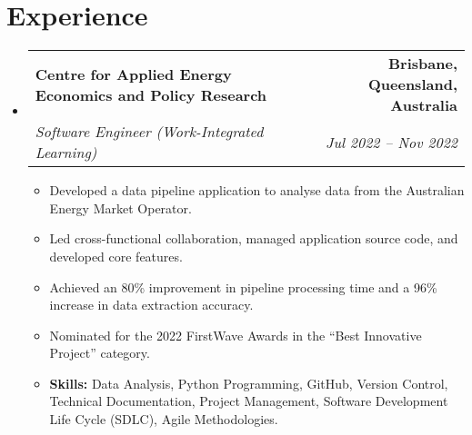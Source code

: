 \documentclass[letterpaper,11pt]{article}
\makeatletter
\newcommand{\resumeItem}[1]{
  \item\small{
    {#1 \vspace{-3pt}}
  }
}
\newcommand{\resumeSubheading}[4]{
  \vspace{-3pt}\item
    \begin{tabular*}{1.0\textwidth}[t]{l@{\extracolsep{\fill}}r}
      \textbf{#1} & \textbf{\small #2} \\
      \textit{\small#3} & \textit{\small #4} \\
    \end{tabular*}\vspace{-7pt}
}
\newcommand{\resumeSubHeadingListStart}{\begin{itemize}[leftmargin=0.0in, label={}]}
\newcommand{\resumeSubHeadingListEnd}{\end{itemize}}
\newcommand{\resumeItemListStart}{\begin{itemize}}
\newcommand{\resumeItemListEnd}{\end{itemize}\vspace{0pt}}
\makeatother
\begin{document}
\section{Experience}
    \resumeSubHeadingListStart
        \resumeSubheading
        {Centre for Applied Energy Economics and Policy Research}{Brisbane, Queensland, Australia}
            {Software Engineer (Work-Integrated Learning)}{Jul 2022 -- Nov 2022}
            \resumeItemListStart
                \resumeItem{Developed a data pipeline application to analyse data from the Australian Energy Market Operator.}
                \resumeItem{Led cross-functional collaboration, managed application source code, and developed core features.}
		\resumeItem{Achieved an 80\% improvement in pipeline processing time and a 96\% increase in data extraction accuracy.}
		\resumeItem{Nominated for the 2022 FirstWave Awards in the ``Best Innovative Project'' category.}
		\resumeItem{\textbf{Skills:} Data Analysis, Python Programming, GitHub, Version Control, Technical Documentation, Project Management, Software Development Life Cycle (SDLC), Agile Methodologies.}
            \resumeItemListEnd
    \resumeSubHeadingListEnd


\end{document}
